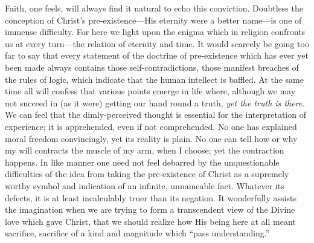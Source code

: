 \documentclass[12pt,a5paper,oneside]{book}
\begin{document}
Faith, one feels, will always find it natural to
echo this conviction. Doubtless the conception
of Christ's pre-existence---His eternity were a
better name---is one of immense difficulty.
For here we light upon the enigma which in
religion confronts us at every turn---the relation
of eternity and time. It would scarcely be
going too far to say that every statement
of the doctrine of pre-existence which has ever
yet been made always contains those self-contradictions,
those manifest breaches of the
rules of logic, which indicate that the human
intellect is baffled. At the same time all will
confess that various points emerge in life where,
although we may not succeed in (as it were)
getting our hand round a truth, \textit{yet the truth
is there}. We can feel that the dimly-perceived
thought is essential for the interpretation of
experience; it is apprehended, even if not comprehended. 
No one has explained moral freedom 
convincingly, yet its reality is plain. No
one can tell how or why my will contracts the
muscle of my arm, when I choose; yet the
contraction happens. In like manner one need
not feel debarred by the unquestionable difficulties 
of the idea from taking the pre-existence
of Christ as a supremely worthy symbol and
indication of an infinite, unnameable fact.
Whatever its defects, it is at least incalculably
truer than its negation. It wonderfully assists
the imagination when we are trying to form
a transcendent view of the Divine love which
gave Christ, that we should realize how His
being here at all meant sacrifice, sacrifice of
a kind and magnitude which ``pass understanding.''
\end{document}
